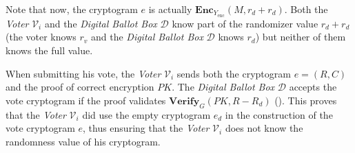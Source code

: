 Note that now, the cryptogram $e$ is actually \( \mathbf{Enc}_{Y_\mathrm{enc}} (M, r_d + r_d) \). Both the \textit{Voter} $\mathcal{V}_i$ and the \textit{Digital Ballot Box} $\mathcal{D}$ know part of the randomizer value \( r_d + r_d \) (the voter knows $r_v$ and the \textit{Digital Ballot Box} $\mathcal{D}$ knows $r_d$) but neither of them knows the full value.

When submitting his vote, the \textit{Voter} $\mathcal{V}_i$ sends both the cryptogram \( e = (R, C) \) and the proof of correct encryption $PK$. The \textit{Digital Ballot Box} $\mathcal{D}$ accepts the vote cryptogram if the proof validates \( \mathbf{Verify}_G (PK, R - R_d) \) (). This proves that the \textit{Voter} $\mathcal{V}_i$ did use the empty cryptogram $e_d$ in the construction of the vote cryptogram $e$, thus ensuring that the \textit{Voter} $\mathcal{V}_i$ does not know the randomness value of his cryptogram.

